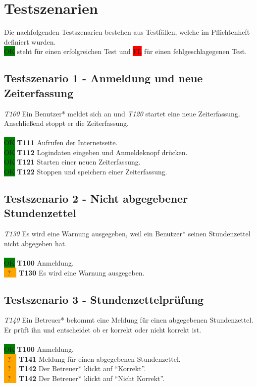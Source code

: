 \section{Testszenarien}
Die nachfolgenden Testszenarien bestehen aus Testfällen, welche im Pflichtenheft \linebreak definiert wurden. \\
\colorbox{green}{OK} steht für einen erfolgreichen Test und \colorbox{red}{FL} für einen fehlgeschlagegenen Test.

\subsection{Testszenario 1 - Anmeldung und neue Zeiterfassung}
\emph{T100} Ein Benutzer* meldet sich an und \emph{T120} startet eine neue Zeiterfassung. Anschließend stoppt er die Zeiterfassung.
\\\\
\colorbox{green}{OK} \textbf{T111} Aufrufen der Internetseite. \\
\colorbox{green}{OK} \textbf{T112} Logindaten eingeben und Anmeldeknopf drücken. \\
\colorbox{green}{OK} \textbf{T121} Starten einer neuen Zeiterfassung. \\
\colorbox{green}{OK} \textbf{T122} Stoppen und speichern einer Zeiterfassung.

\subsection{Testszenario 2 - Nicht abgegebener Stundenzettel}
\emph{T130} Es wird eine Warnung ausgegeben, weil ein Benutzer* seinen Stundenzettel nicht abgegeben hat.
\\\\
\colorbox{green}{OK} \textbf{T100} Anmeldung. \\
\colorbox{orange}{  \ ? \  } \textbf{T130} Es wird eine Warnung ausgegeben.

\subsection{Testszenario 3 - Stundenzettelprüfung}
\emph{T140} Ein Betreuer* bekommt eine Meldung für einen abgegebenen Stundenzettel. Er prüft ihn und entscheidet ob er korrekt oder nicht korrekt ist.
\\\\
\colorbox{green}{OK} \textbf{T100} Anmeldung. \\
\colorbox{orange}{  \ ? \  } \textbf{T141} Meldung für einen abgegebenen Stundenzettel. \\
\colorbox{orange}{  \ ? \  } \textbf{T142} Der Betreuer* klickt auf "`Korrekt"'. \\
\colorbox{orange}{  \ ? \  } \textbf{T142} Der Betreuer* klickt auf "`Nicht Korrekt"'.

